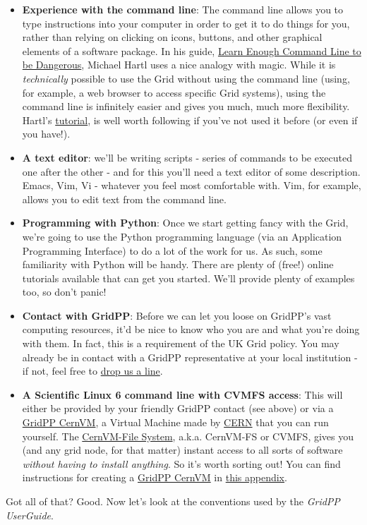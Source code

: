 \begin{itemize}
\item
  \textbf{Experience with the command line}: The command line allows you
  to type instructions into your computer in order to get it to do
  things for you, rather than relying on clicking on icons, buttons, and
  other graphical elements of a software package. In his guide,
  \href{http://www.learnenough.com/command-line-tutorial}{Learn Enough
  Command Line to be Dangerous}, Michael Hartl uses a nice analogy with
  magic. While it is \emph{technically} possible to use the Grid without
  using the command line (using, for example, a web browser to access
  specific Grid systems), using the command line is infinitely easier
  and gives you much, much more flexibility. Hartl's
  \href{http://www.learnenough.com/command-line-tutorial}{tutorial}, is
  well worth following if you've not used it before (or even if you
  have!).
\item
  \textbf{A text editor}: we'll be writing scripts - series of commands
  to be executed one after the other - and for this you'll need a text
  editor of some description. Emacs, Vim, Vi - whatever you feel most
  comfortable with. Vim, for example, allows you to edit text from the
  command line.
\item
  \textbf{Programming with Python}: Once we start getting fancy with the
  Grid, we're going to use the Python programming language (via an
  Application Programming Interface) to do a lot of the work for us. As
  such, some familiarity with Python will be handy. There are plenty of
  (free!) online tutorials available that can get you started. We'll
  provide plenty of examples too, so don't panic!
\item
  \textbf{Contact with GridPP}: Before we can let you loose on GridPP's
  vast computing resources, it'd be nice to know who you are and what
  you're doing with them. In fact, this is a requirement of the UK Grid
  policy. You may already be in contact with a GridPP representative at
  your local institution - if not, feel free to
  \href{https://www.gridpp.ac.uk/contact/}{drop us a line}.
\item
  \textbf{A Scientific Linux 6 command line with CVMFS access}: This
  will either be provided by your friendly GridPP contact (see above) or
  via a \href{../gridpp-cernvm/gridpp-cernvm.html}{GridPP CernVM}, a
  Virtual Machine made by \href{http://cern.home}{CERN} that you can run
  yourself. The \href{https://cernvm.cern.ch/}{CernVM-File System},
  a.k.a. CernVM-FS or CVMFS, gives you (and any grid node, for that
  matter) instant access to all sorts of software \emph{without having
  to install anything}. So it's worth sorting out! You can find
  instructions for creating a
  \href{../gridpp-cernvm/gridpp-cernvm.html}{GridPP CernVM} in
  \href{../gridpp-cernvm/gridpp-cernvm.html}{this appendix}.
\end{itemize}

Got all of that? Good. Now let's look at the
conventions used by the \emph{GridPP UserGuide}.
